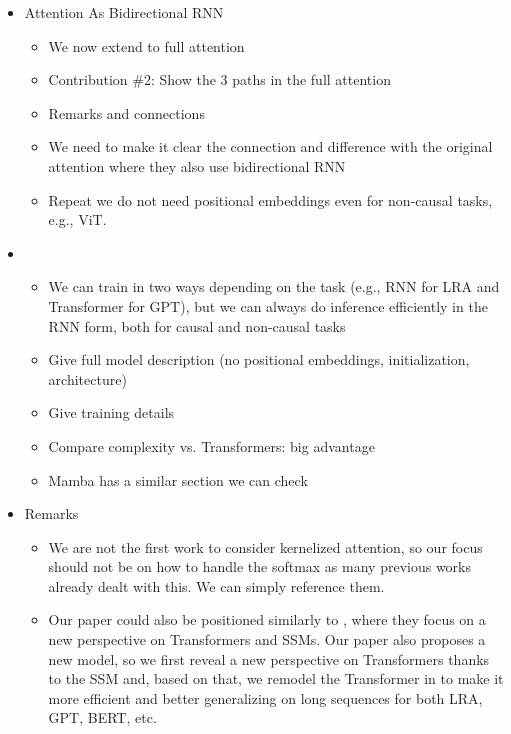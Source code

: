 \begin{itemize}[leftmargin=0pt]
\item[] {\large Attention As Bidirectional RNN}
\begin{itemize}
    \item We now extend to full attention
    \item Contribution \#2: Show the 3 paths in the full attention
    \item Remarks and connections
    \item We need to make it clear the connection and difference with the original attention where they also use bidirectional RNN \citep[Sec. 3]{bahdanau2015neural}
    \item Repeat we do not need positional embeddings even for non-causal tasks, e.g., ViT.
\end{itemize}

\item[] {\large \ours}
\begin{itemize}
    \item We can train in two ways depending on the task (e.g., RNN for LRA and Transformer for GPT), but we can always do inference efficiently in the RNN form, both for causal and non-causal tasks
    \item Give full model description (no positional embeddings, initialization, architecture)
    \item Give training details
    \item Compare complexity vs. Transformers: big advantage
    \item Mamba has a similar section we can check
\end{itemize}

\item[] {\large Remarks}
\begin{itemize}
    \item We are not the first work to consider kernelized attention, so our focus should not be on how to handle the softmax as many previous works already dealt with this. We can simply reference them.
    \item Our paper could also be positioned similarly to \citep{han2024demystify}, where they focus on a new perspective on Transformers and SSMs. Our paper also proposes a new model, so we first reveal a new perspective on Transformers thanks to the SSM and, based on that, we remodel the Transformer in \ours to make it more efficient and better generalizing on long sequences for both LRA, GPT, BERT, etc.
\end{itemize}
\end{itemize}
